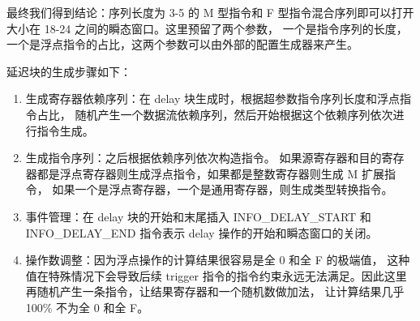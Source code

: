 \begin{table}[h!]
    \begin{center} 
    \caption{整数指令组合} 
    \label{table:int-seq}  
    \end{center}
\end{table}

最终我们得到结论：序列长度为 3-5 的 M 型指令和 F 型指令混合序列即可以打开大小在 18-24 之间的瞬态窗口。这里预留了两个参数，
一个是指令序列的长度，一个是浮点指令的占比，这两个参数可以由外部的配置生成器来产生。\par

延迟块的生成步骤如下：
\begin{enumerate}
    \item 生成寄存器依赖序列：在 delay 块生成时，根据超参数指令序列长度和浮点指令占比，
随机产生一个数据流依赖序列，然后开始根据这个依赖序列依次进行指令生成。\par

    \item 生成指令序列：之后根据依赖序列依次构造指令。
如果源寄存器和目的寄存器都是浮点寄存器则生成浮点指令，如果都是整数寄存器则生成 M 扩展指令，
如果一个是浮点寄存器，一个是通用寄存器，则生成类型转换指令。\par

    \item 事件管理：在 delay 块的开始和末尾插入 INFO\_DELAY\_START 
和 INFO\_DELAY\_END 指令表示 delay 操作的开始和瞬态窗口的关闭。\par

    \item 操作数调整：因为浮点操作的计算结果很容易是全 0 和全 F 的极端值，
这种值在特殊情况下会导致后续 trigger 指令的指令约束永远无法满足。因此这里再随机产生一条指令，让结果寄存器和一个随机数做加法，
让计算结果几乎 100\% 不为全 0 和全 F。\par
\end{enumerate}

